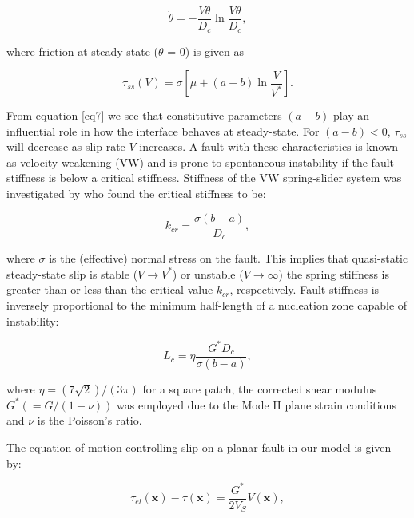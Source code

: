 \documentclass[preprint,1p, 10pt,authoryear]{elsarticle}
\begin{document}
\begin{equation}
\label{eq6}
\dot{\theta} = - \frac{V\theta}{D_{c}}\ln\frac{V\theta}{D_{c}},
\end{equation}   

\noindent where friction at steady state ($\dot{\theta} $ = 0) is given as

\begin{equation}
\label{eq7}
\tau_{ss} \left( V \right) = \sigma \left[\mu + \left(a - b \right)\ln\frac{V}{V^{*}}\right].
\end{equation}   

\noindent From equation \eqref{eq7} we see that constitutive parameters $\left(a - b \right)$ play an influential role in how the interface behaves at steady-state.  For $\left(a - b \right) < 0$, $\tau_{ss}$ will decrease as slip rate $V$ increases.  A fault with these characteristics is known as velocity-weakening (VW) and is prone to spontaneous instability if the fault stiffness is below a critical stiffness. Stiffness of the VW spring-slider system was investigated by \citet{Ranjith1999} who found the critical stiffness to be:

\begin{equation}
\label{eq9}
k_{cr}=\frac{\sigma \left( b-a \right)}{D_{c}},
\end{equation}   

\noindent where $\sigma$ is the (effective) normal stress on the fault. This implies that quasi-static steady-state slip is stable ($V \rightarrow V^{*}$) or unstable ($V \rightarrow \infty$) the spring stiffness is greater than or less than the critical value $k_{cr}$, respectively. Fault stiffness is inversely proportional to the minimum half-length of a nucleation zone capable of instability:

\begin{equation}
\label{eq8}
L_{c} = \eta \frac{G^{*} D_{c}}{ \sigma \left( b-a\right)},
\end{equation}   

\noindent where $\eta = (7\sqrt{2})/(3\pi)$ \citep{Dieterich1992} for a square patch, the corrected shear modulus $G^{*} (= G/(1-\nu))$ was employed due to the Mode II plane strain conditions and $\nu$ is the Poisson's ratio. 

The equation of motion controlling slip on a planar fault in our model is given by:

\begin{equation}
\label{eq8a}
\tau_{el}\left( \mathbf{x} \right) - \tau\left( \mathbf{x} \right) = \frac{G^{*}}{2 V_{S}} V(\mathbf{x}),
\end{equation}  
\end{document}

